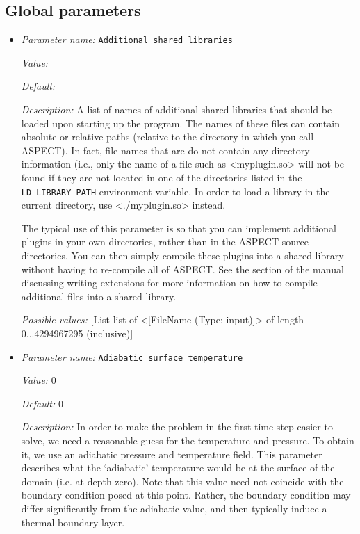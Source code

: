 \subsection{Global parameters}
\label{parameters:global}


\begin{itemize}
\item {\it Parameter name:} {\tt Additional shared libraries}
\label{parameters:Additional shared libraries}


{\it Value:} 


{\it Default:} 


{\it Description:} A list of names of additional shared libraries that should be loaded upon starting up the program. The names of these files can contain absolute or relative paths (relative to the directory in which you call ASPECT). In fact, file names that are do not contain any directory information (i.e., only the name of a file such as <myplugin.so> will not be found if they are not located in one of the directories listed in the \texttt{LD_LIBRARY_PATH} environment variable. In order to load a library in the current directory, use <./myplugin.so> instead.

The typical use of this parameter is so that you can implement additional plugins in your own directories, rather than in the ASPECT source directories. You can then simply compile these plugins into a shared library without having to re-compile all of ASPECT. See the section of the manual discussing writing extensions for more information on how to compile additional files into a shared library.


{\it Possible values:} [List list of <[FileName (Type: input)]> of length 0...4294967295 (inclusive)]
\item {\it Parameter name:} {\tt Adiabatic surface temperature}
\label{parameters:Adiabatic surface temperature}


{\it Value:} 0


{\it Default:} 0


{\it Description:} In order to make the problem in the first time step easier to solve, we need a reasonable guess for the temperature and pressure. To obtain it, we use an adiabatic pressure and temperature field. This parameter describes what the `adiabatic' temperature would be at the surface of the domain (i.e. at depth zero). Note that this value need not coincide with the boundary condition posed at this point. Rather, the boundary condition may differ significantly from the adiabatic value, and then typically induce a thermal boundary layer.


\end{itemize}
